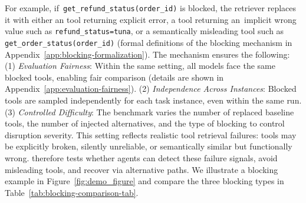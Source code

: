 For example, if~\texttt{get\_refund\_status(order\_id)} is blocked, the retriever replaces it with either an tool returning explicit error, a tool returning an~implicit wrong value such as \texttt{refund\_status=tuna}, or a semantically misleading tool such as \texttt{get\_order\_status(order\_id)} (formal definitions of the blocking mechanism in Appendix~\ref{app:blocking-formalization}).
The mechanism ensures the following:
(1) \textit{Evaluation Fairness}: Within the same setting, all models face the same blocked tools, enabling fair comparison (details are shown in Appendix~\ref{app:evaluation-fairness}).
(2) \textit{Independence Across Instances}: Blocked tools are sampled independently for each task instance, even within the same run.
(3) \textit{Controlled Difficulty}: The benchmark varies the number of replaced baseline tools, the number of injected alternatives, and the type of blocking to control disruption severity.
This setting reflects realistic tool retrieval failures: tools may be explicitly broken, silently unreliable, or semantically similar but functionally wrong. 
\bench{} therefore tests whether agents can detect these failure signals, avoid misleading tools, and recover via alternative paths.
We illustrate a blocking example in Figure~\ref{fig:demo_figure} and compare the three blocking types in Table~\ref{tab:blocking-comparison-tab}.







